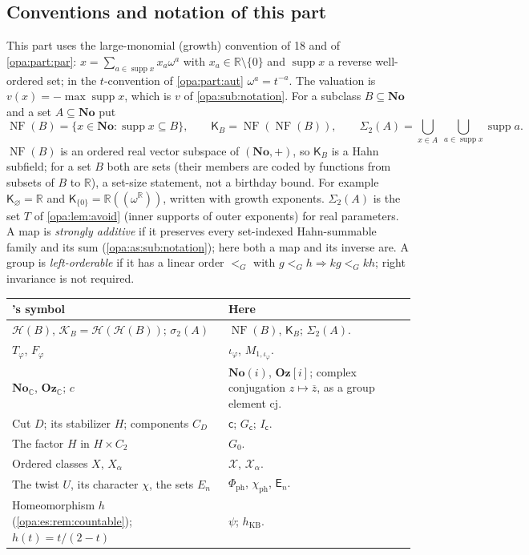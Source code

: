 \documentclass[11pt,oneside]{article}
\numberwithin{equation}{section}
\theoremstyle{definition}
\theoremstyle{remark}
\newcommand{\No}{\mathbf{No}}
\newcommand{\Og}{\mathbf{Oz}[i]}
\newcommand{\SC}{\mathbf{No}(i)}
\newcommand{\R}{\mathbb R}
\newcommand{\C}{\mathbb C}
\newcommand{\supp}{\operatorname{supp}}
\newcommand{\NF}{\operatorname{NF}}
\begin{document}
\subsection{Conventions and notation of this part}\label{opa:es:sub:notation}

This part uses the large-monomial (growth) convention of 18 and of \cref{opa:part:par}: $x=\sum_{a\in\supp x}x_a\omega^a$ with
$x_a\in\R\setminus\{0\}$ and $\supp x$ a reverse well-ordered set; in the $t$-convention of \cref{opa:part:aut} $\omega^a=t^{-a}$.
The valuation is $v(x)=-\max\supp x$, which is $v$ of \cref{opa:sub:notation}. For a subclass $B\subseteq\No$ and a set
$A\subseteq\No$ put
\begin{equation}\label{opa:es:eq:hull}
 \NF(B)=\{x\in\No:\supp x\subseteq B\},\qquad \mathsf K_B=\NF(\NF(B)),\qquad
 \Sigma_2(A)=\bigcup_{x\in A}\ \bigcup_{a\in\supp x}\supp a .
\end{equation}
$\NF(B)$ is an ordered real vector subspace of $(\No,+)$, so $\mathsf K_B$ is a Hahn subfield; for a set $B$ both are sets (their
members are coded by functions from subsets of $B$ to $\R$), a set-size statement, not a birthday bound. For example
$\mathsf K_\varnothing=\R$ and $\mathsf K_{\{0\}}=\R((\omega^\R))$, written with growth exponents. $\Sigma_2(A)$ is the set $T$ of
\cref{opa:lem:avoid} (inner supports of outer exponents) for real parameters. A map is \emph{strongly additive} if it preserves
every set-indexed Hahn-summable family and its sum (\cref{opa:as:sub:notation}); here both a map and its inverse are. A group is
\emph{left-orderable} if it has a linear order $<_G$ with $g<_Gh\Rightarrow kg<_Gkh$; right invariance is not required.

\begin{center}
\renewcommand{\arraystretch}{1.15}
\begin{longtable}{>{\raggedright\arraybackslash}p{}>{\raggedright\arraybackslash}p{}}
\toprule
18's symbol & Here\\
\midrule
\endhead
$\mathcal H(B)$, $\mathcal K_B=\mathcal H(\mathcal H(B))$; $\sigma_2(A)$ & $\NF(B)$, $\mathsf K_B$; $\Sigma_2(A)$.\\
$T_\varphi$, $F_\varphi$ & $\iota_\varphi$, $M_{1,\iota_\varphi}$.\\
$\mathbf{No}_\C$, $\mathbf{Oz}_\C$; $c$ & $\SC$, $\Og$; complex conjugation $z\mapsto\overline z$, as a group element $\mathrm{cj}$.\\
Cut $D$; its stabilizer $H$; components $C_D$ & $\mathsf c$; $G_{\mathsf c}$; $I_{\mathsf c}$.\\
The factor $H$ in $H\times C_2$ & $G_0$.\\
Ordered classes $X$, $X_\alpha$ & $\mathcal X$, $\mathcal X_\alpha$.\\
The twist $U$, its character $\chi$, the sets $E_n$ & $\Phi_{\mathrm{ph}}$, $\chi_{\mathrm{ph}}$, $\mathsf E_n$.\\
Homeomorphism $h$ (\cref{opa:es:rem:countable}); $h(t)=t/(2-t)$ & $\psi$; $h_{\mathrm{KB}}$.\\
\bottomrule
\end{longtable}
\end{center}
\end{document}

